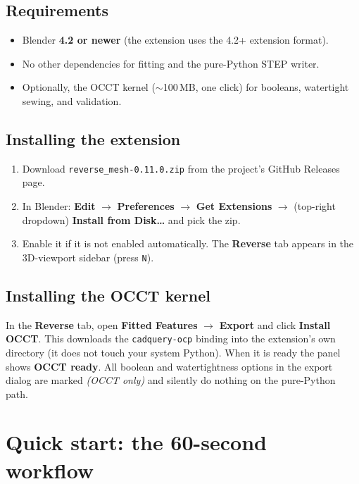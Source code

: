 \documentclass[11pt,a4paper]{article}
\newcommand{\ui}[1]{\textsf{\textbf{#1}}}   %
\newcommand{\version}{0.11.0}
\begin{document}
\subsection{Requirements}

\begin{itemize}[nosep]
  \item Blender \textbf{4.2 or newer} (the extension uses the 4.2+ extension
    format).
  \item No other dependencies for fitting and the pure-Python STEP writer.
  \item Optionally, the OCCT kernel ($\sim$100\,MB, one click) for booleans,
    watertight sewing, and validation.
\end{itemize}

\subsection{Installing the extension}

\begin{enumerate}[nosep]
  \item Download \texttt{reverse\_mesh-\version.zip} from the project's GitHub
    Releases page.
  \item In Blender: \ui{Edit} $\to$ \ui{Preferences} $\to$ \ui{Get Extensions}
    $\to$ (top-right dropdown) \ui{Install from Disk\ldots} and pick the zip.
  \item Enable it if it is not enabled automatically. The \ui{Reverse} tab
    appears in the 3D-viewport sidebar (press \texttt{N}).
\end{enumerate}

\subsection{Installing the OCCT kernel}
\label{sec:occt}

In the \ui{Reverse} tab, open \ui{Fitted Features} $\to$ \ui{Export} and click
\ui{Install OCCT}. This downloads the \texttt{cadquery-ocp} binding into the
extension's own directory (it does not touch your system Python). When it is
ready the panel shows \ui{OCCT ready}. All boolean and watertightness options
in the export dialog are marked \emph{(OCCT only)} and silently do nothing on
the pure-Python path.

\section{Quick start: the 60-second workflow}
\end{document}
